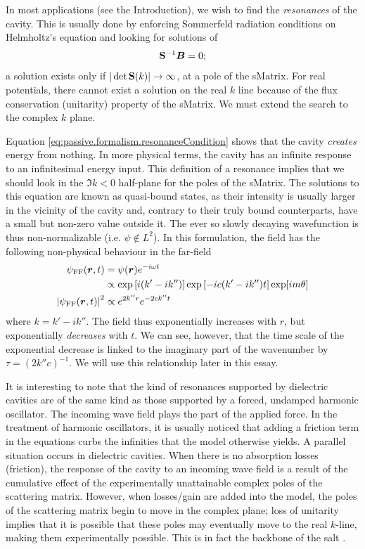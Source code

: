 In most applications (see the Introduction), we wish to find the \textit{resonances} of the
cavity. This is usually done by enforcing Sommerfeld radiation conditions
on Helmholtz's equation and looking for solutions of
  \begin{equation}
   \label{eq:passive.formalism.resonanceCondition}
   \mathbf{S}^{-1}\boldsymbol{B}=0;
  \end{equation}
a solution exists only if $|\det{\mathbf{S}(k)}|\rightarrow\infty$, 
at a pole of the \gls{sMatrix}. 
For real potentials, there cannot exist a solution on the real $k$ line because
of the flux conservation (unitarity) property of the \gls{sMatrix}. We 
must extend the search to the complex $k$ plane.

Equation \eqref{eq:passive.formalism.resonanceCondition} shows that the cavity 
\textit{creates} energy from nothing. In more physical terms, the cavity
has an infinite response to an infinitesimal energy input. This definition
of a resonance implies that we should look in the $\Im{k}<0$ half-plane
for the poles of the \gls{sMatrix}. The solutions to this equation 
are known as quasi-bound states, as their intensity is usually larger
in the vicinity of the cavity and, contrary to their truly bound counterparts, 
have a small but non-zero value outside it. The ever so slowly decaying wavefunction
is thus non-normalizable (i.e. $\psi\notin L^2$). In this formulation, the field
has the following non-physical behaviour in the far-field
  \begin{align*}
   \psi_\text{FF}(\boldsymbol{r},t) 			&= \psi(\boldsymbol{r})e^{-i\omega t}	\\
						&\propto \exp\left[i(k'-ik'')\right]\exp\left[-ic(k'-ik'')t\right]\exp[im\theta]	\\
   \left|\psi_\text{FF}(\boldsymbol{r},t)\right|^2 	&\propto e^{2k''r}e^{-2ck''t} 
  \end{align*}
where $k=k'-ik''$. The field thus exponentially increases with $r$, 
but exponentially \textit{decreases} with $t$. We can see, however, 
that the time scale of the exponential decrease is linked to the
imaginary part of the wavenumber by $\tau=\left(2k''c\right)^{-1}$.
We will use this relationship later in this essay.

It is interesting to note that the kind of resonances supported
by dielectric cavities are of the same kind as those supported
by a forced, undamped harmonic oscillator. The incoming wave field
plays the part of the applied force. In the treatment of 
harmonic oscillators, it is usually noticed that adding a friction 
term in the equations curbs the infinities that the model otherwise 
yields. A parallel situation occurs in dielectric cavities. When there
is no absorption losses (friction), the response of the cavity 
to an incoming wave field is a result of the cumulative effect 
of the experimentally unattainable complex poles of the scattering matrix. 
However, when losses/gain are added into the model, the poles of the scattering
matrix begin to move in the complex plane; loss of unitarity implies that
it is possible that these poles may eventually move to the real $k$-line, 
making them experimentally possible. This is in fact the backbone 
of the \gls{salt} \cite{GE2010a,GE2010b}.

